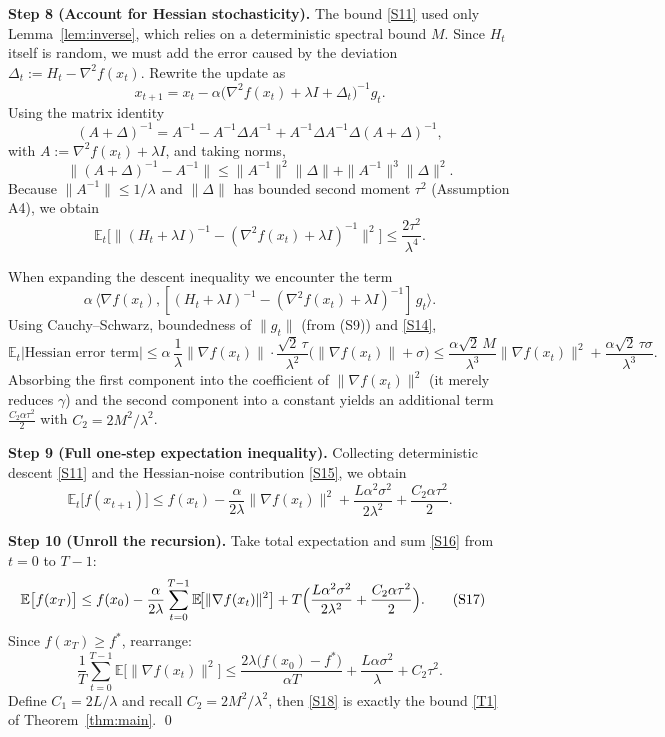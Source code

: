 \documentclass{article}
\newcommand{\EE}{\mathbb{E}}
\newcommand{\ip}[2]{\langle #1,#2\rangle}
\begin{document}
\noindent\textbf{Step 8 (Account for Hessian stochasticity).}
The bound \eqref{S11} used only Lemma~\ref{lem:inverse}, which relies on
a deterministic spectral bound $M$.  Since $H_t$ itself is random,
we must add the error caused by the deviation
$\Delta_t:=H_t-\nabla^{2}f(x_t)$.
Rewrite the update as
\[
x_{t+1}=x_t-\alpha\bigl(\nabla^{2}f(x_t)+\lambda I+\Delta_t\bigr)^{-1}g_t .
\]
Using the matrix identity
\[
(A+\Delta)^{-1}=A^{-1}-A^{-1}\Delta A^{-1}+A^{-1}\Delta A^{-1}\Delta (A+\Delta)^{-1},
\tag{S12}
\]
with $A:=\nabla^{2}f(x_t)+\lambda I$, and taking norms,
\[
\bigl\|(A+\Delta)^{-1}-A^{-1}\bigr\|
\le \|A^{-1}\|^{2}\|\Delta\|
    +\|A^{-1}\|^{3}\|\Delta\|^{2}.
\tag{S13}
\]
Because $\|A^{-1}\|\le 1/\lambda$ and $\|\Delta\|$ has bounded second
moment $\tau^{2}$ (Assumption A4), we obtain
\[
\EE_t\!\bigl[\|(H_t+\lambda I)^{-1}-(\nabla^{2}f(x_t)+\lambda I)^{-1}\|^{2}\bigr]
\le \frac{2\tau^{2}}{\lambda^{4}} .
\tag{S14}
\]

When expanding the descent inequality we encounter the term
\[
\alpha\,\ip{\nabla f(x_t)}{[(H_t+\lambda I)^{-1}-(\nabla^{2}f(x_t)+\lambda I)^{-1}]\,g_t } .
\]
Using Cauchy–Schwarz, boundedness of $\|g_t\|$ (from (S9)) and
\eqref{S14},
\[
\EE_t\bigl|\text{Hessian error term}\bigr|
\le \alpha\,
\frac{1}{\lambda}\|\nabla f(x_t)\|
\cdot\frac{\sqrt{2}\,\tau}{\lambda^{2}}\bigl(\|\nabla f(x_t)\|+\sigma\bigr)
\le \frac{\alpha\sqrt{2}\,M}{\lambda^{3}}\|\nabla f(x_t)\|^{2}
    +\frac{\alpha\sqrt{2}\,\tau\sigma}{\lambda^{3}} .
\tag{S15}
\]
Absorbing the first component into the coefficient of
$\|\nabla f(x_t)\|^{2}$ (it merely reduces $\gamma$) and the second
component into a constant yields an additional term
$\frac{C_{2}\alpha\tau^{2}}{2}$ with $C_{2}=2M^{2}/\lambda^{2}$.

\noindent\textbf{Step 9 (Full one‑step expectation inequality).}
Collecting deterministic descent \eqref{S11} and the Hessian‑noise
contribution \eqref{S15}, we obtain
\[
\EE_t\bigl[f(x_{t+1})\bigr]
\le f(x_t)-\frac{\alpha}{2\lambda}\|\nabla f(x_t)\|^{2}
    +\frac{L\alpha^{2}\sigma^{2}}{2\lambda^{2}}
    +\frac{C_{2}\alpha\tau^{2}}{2}.
\tag{S16}
\]

\noindent\textbf{Step 10 (Unroll the recursion).}
Take total expectation and sum \eqref{S16} from $t=0$ to $T-1$:
\begin{align}
\EE\bigl[f(x_T)\bigr]
&\le f(x_0)-\frac{\alpha}{2\lambda}\sum_{t=0}^{T-1}
      \EE\!\bigl[\|\nabla f(x_t)\|^{2}\bigr]
   +T\Bigl(\frac{L\alpha^{2}\sigma^{2}}{2\lambda^{2}}
          +\frac{C_{2}\alpha\tau^{2}}{2}\Bigr).
\tag{S17}
\end{align}
Since $f(x_T)\ge f^{*}$, rearrange:
\[
\frac{1}{T}\sum_{t=0}^{T-1}\EE\!\bigl[\|\nabla f(x_t)\|^{2}\bigr]
\le
\frac{2\lambda\bigl(f(x_0)-f^{*}\bigr)}{\alpha T}
   +\frac{L\alpha\sigma^{2}}{\lambda}
   +C_{2}\tau^{2}.
\tag{S18}
\]
Define $C_{1}=2L/\lambda$ and recall $C_{2}=2M^{2}/\lambda^{2}$, then
\eqref{S18} is exactly the bound \eqref{T1} of Theorem~\ref{thm:main}.
\qed
\end{document}
